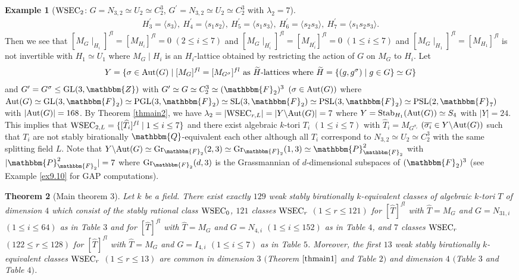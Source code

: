 \documentclass{amsart}
\theoremstyle{plain}
\newtheorem{theorem}{Theorem}[section]
\theoremstyle{definition}
\newtheorem{example}[theorem]{Example}
\theoremstyle{remark}
\newcommand{\bZ}{\mathbbm{Z}}\newcommand{\bQ}{\mathbbm{Q}}
\newcommand{\bF}{\mathbbm{F}}\newcommand{\bP}{\mathbbm{P}}
\newcounter{sub}\def\tr{\mbox{tr }}
\begin{document}
\begin{example}[${\rm WSEC}_2$: $G=N_{3,2}\simeq U_2\simeq C_2^3$, $G^\prime=N_{3,2}\simeq U_2\simeq C_2^3$ with $\lambda_2=7$]
\begin{align*}
H_3^\prime=\langle s_3\rangle,\ 
H_4^\prime=\langle s_1s_2\rangle,\ 
H_5^\prime=\langle s_1s_3\rangle,\ 
H_6^\prime=\langle s_2s_3\rangle,\ 
H_7^\prime=\langle s_1s_2s_3\rangle. 
\end{align*}
Then we see that $[M_G\mid_{H_i}]^{fl}=[M_{H_i}]^{fl}=0$ 
$(2\leq i\leq 7)$ 
and $[M_G\mid_{H_i^\prime}]^{fl}=[M_{H_i^\prime}]^{fl}=0$ $(1\leq i\leq 7)$ 
and $[M_G\mid_{H_1}]^{fl}=[M_{H_1}]^{fl}$ is not invertible 
with $H_1\simeq U_1$ 
where $M_G\mid H_i$ is an $H_i$-lattice obtained 
by restricting the action of $G$ on $M_G$ to $H_i$. 
%
Let 
\begin{align*}
Y=\{\sigma\in{\rm Aut}(G)\mid [M_G]^{fl}=[M_{G^\sigma}]^{fl}\ {\rm as}\ 
\widetilde{H}\textrm{-{\rm lattices}}\ {\rm where}\ \widetilde{H}=\{(g,g^\sigma)\mid g\in G\}\simeq G\}
\end{align*}
and $G^\prime=G^\sigma\leq {\rm GL}(3,\bZ)$ with 
$G^\prime\simeq G\simeq  C_2^3\simeq (\bF_2)^3$ 
$(\sigma\in {\rm Aut}(G))$ where 
${\rm Aut}(G)\simeq {\rm GL}(3,\bF_2)\simeq 
{\rm PGL}(3,\bF_2)\simeq {\rm SL}(3,\bF_2)\simeq {\rm PSL}(3,\bF_2)
\simeq {\rm PSL}(2,\bF_7)$ 
with $|{\rm Aut}(G)|=168$. 
%
By Theorem \ref{thmain2}, we have 
$\lambda_2=|{\rm WSEC}_{r,L}|=|Y\backslash {\rm Aut}(G)|=7$ 
where $Y={\rm Stab}_{H_1}({\rm Aut}(G))\simeq S_4$ with $|Y|=24$. 
This implies that ${\rm WSEC}_{2,L}=\{[\widehat{T}_i]^{fl}\mid 1\leq i\leq 7\}$
and there exist algebraic $k$-tori $T_i$ $(1\leq i\leq 7)$ with 
$\widehat{T}_i=M_{G^{\sigma_i}}$ $(\overline{\sigma_i} 
\in Y\backslash {\rm Aut}(G))$ 
such that $T_i$  are not stably birationally $\bQ$-equivalent each other 
although all $T_i$ correspond to $N_{3,2}\simeq U_2\simeq C_2^3$ 
with the same splitting field $L$. 
Note that $Y\backslash {\rm Aut}(G)\simeq {\rm Gr}_{\bF_2}(2,3)\simeq {\rm Gr}_{\bF_2}(1,3)\simeq \bP^2_{\bF_2}$ with $|\bP^2_{\bF_2}|=7$ 
where ${\rm Gr}_{\bF_2}(d,3)$ is 
the Grassmannian of $d$-dimensional subspaces of $(\bF_2)^3$ 
(see Example \ref{ex9.10} for GAP computations). 
\end{example}
%
\begin{theorem}[Main theorem 3]\label{thmain3}
Let $k$ be a field. 
There exist exactly $129$ weak stably birationally $k$-equivalent classes 
of algebraic $k$-tori $T$ of dimension $4$ which consist of 
the stably rational class ${\rm WSEC}_0$, 
$121$ classes ${\rm WSEC}_r$ $(1\leq r\leq 121)$ for 
$[\widehat{T}]^{fl}$ with $\widehat{T}=M_G$ and $G=N_{31,i}$ $(1\leq i\leq 64)$ as in {\rm Table} $3$ 
and for 
$[\widehat{T}]^{fl}$ with $\widehat{T}=M_G$ and 
$G=N_{4,i}$ $(1\leq i\leq 152)$ as in {\rm Table} $4$, 
and $7$ classes ${\rm WSEC}_r$ $(122\leq r\leq 128)$ for 
$[\widehat{T}]^{fl}$ with $\widehat{T}=M_G$ and 
$G=I_{4,i}$ $(1\leq i\leq 7)$ as in {\rm Table} $5$. 
Moreover, 
the first $13$ weak stably birationally $k$-equivalent classes 
${\rm WSEC}_r$ $(1\leq r\leq 13)$ are common in 
dimension $3$ $(${\rm Theorem} $\ref{thmain1}$ and {\rm Table} $2$$)$ 
and dimension $4$ $(${\rm Table} $3$ and {\rm Table} $4$$)$. 
\end{theorem}
%
\end{document}
